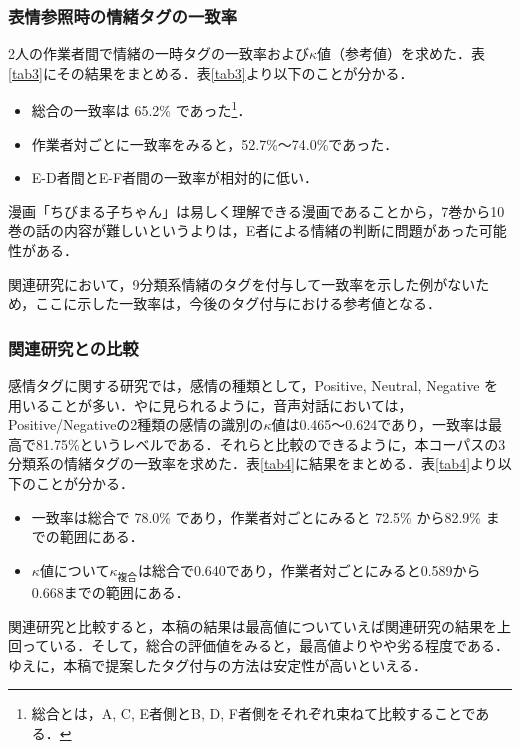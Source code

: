 \documentclass[japanese]{jnlp_1.3c}
\begin{document}
\subsubsection{表情参照時の情緒タグの一致率}

2人の作業者間で情緒の一時タグの一致率および$\kappa$値（参考値）を求めた．表\ref{tab3}にその結果をまとめる．表\ref{tab3}より以下のことが分かる．

\begin{itemize}
\item 総合の一致率は 65.2\% であった\footnote{総合とは，A, C, E者側とB, D, F者側をそれぞれ束ねて比較することである．}．
\item 作業者対ごとに一致率をみると，52.7\%〜74.0\%であった．
\item E-D者間とE-F者間の一致率が相対的に低い．
\end{itemize}

漫画「ちびまる子ちゃん」は易しく理解できる漫画であることから，7巻から10巻の話の内容が難しいというよりは，E者による情緒の判断に問題があった可能性がある．

関連研究において，9分類系情緒のタグを付与して一致率を示した例がないため，ここに示した一致率は，今後のタグ付与における参考値となる．


\subsubsection{関連研究との比較}

感情タグに関する研究では，感情の種類として，Positive, Neutral, Negative を用いることが多い．\cite{Litman03}や\cite{Narayanan02}に見られるように，音声対話においては，Positive/Negativeの2種類の感情の識別の$\kappa$値は0.465〜0.624であり，一致率は最高で81.75\%というレベルである．それらと比較のできるように，本コーパスの3分類系の情緒タグの一致率を求めた．表\ref{tab4}に結果をまとめる．表\ref{tab4}より以下のことが分かる．

\begin{itemize}
\item 一致率は総合で 78.0\% であり，作業者対ごとにみると 72.5\% から82.9\% までの範囲にある．
\item $\kappa$値について$\kappa_{\mbox{複合}}$は総合で0.640であり，作業者対ごとにみると0.589から0.668までの範囲にある．
\end{itemize}

関連研究と比較すると，本稿の結果は最高値についていえば関連研究の結果を上回っている．そして，総合の評価値をみると，最高値よりやや劣る程度である．ゆえに，本稿で提案したタグ付与の方法は安定性が高いといえる．
\end{document}
